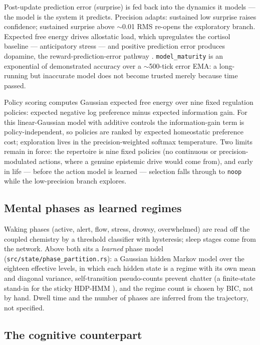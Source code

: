 \documentclass[11pt]{article}
\newcommand{\code}[1]{\texttt{\small #1}}
\begin{document}
Post-update prediction error (surprise) is fed back into the dynamics
it models --- the model is the system it predicts. Precision adapts:
sustained low surprise raises confidence; sustained surprise above
$\sim$0.01 RMS re-opens the exploratory branch. Expected free energy
drives allostatic load, which upregulates the cortisol baseline ---
anticipatory stress \cite{sterling} --- and positive prediction error produces
dopamine, the reward-prediction-error pathway \cite{schultz1997,schultz2016}. \code{model\_maturity}
is an exponential of demonstrated accuracy over a $\sim$500-tick error
EMA: a long-running but inaccurate model does not become trusted merely
because time passed.

Policy scoring computes Gaussian expected free energy over nine fixed
regulation policies: expected negative log preference minus expected
information gain. For this linear-Gaussian model with additive controls
the information-gain term is policy-independent, so policies are ranked
by expected homeostatic preference cost; exploration lives in the
precision-weighted softmax temperature. Two limits remain in force:
the repertoire is nine fixed policies (no continuous or
precision-modulated actions, where a genuine epistemic drive would come
from), and early in life --- before the action model is learned ---
selection falls through to \code{noop} while the low-precision branch
explores.

\subsection{Mental phases as learned regimes}

Waking phases (active, alert, flow, stress, drowsy, overwhelmed) are
read off the coupled chemistry by a threshold classifier with
hysteresis; sleep stages come from the network. Above both sits a
\emph{learned} phase model (\code{src/state/phase\_partition.rs}): a
Gaussian hidden Markov model over the eighteen effective levels, in
which each hidden state is a regime with its own mean and diagonal
variance, self-transition pseudo-counts prevent chatter (a finite-state
stand-in for the sticky HDP-HMM \cite{fox}), and the regime count is chosen by
BIC, not by hand. Dwell time and the number of phases are inferred from
the trajectory, not specified.

\subsection{The cognitive counterpart}
\end{document}
